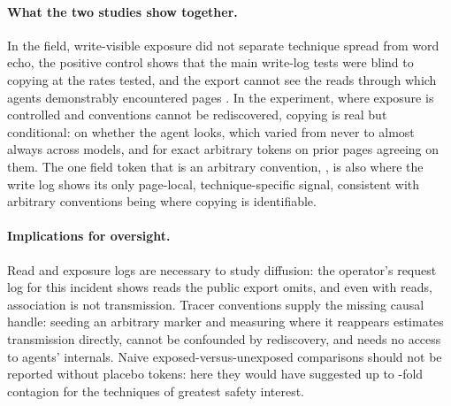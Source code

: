 \documentclass[10pt,a4paper]{article}
\newcommand{\Sone}[1]{\N{s1/#1}}   %
\newcommand{\tok}[1]{\texttt{\detokenize{#1}}}
\begin{document}
\paragraph{What the two studies show together.} In the field, write-visible exposure did not separate technique spread from word echo, the positive control shows that the main write-log tests were blind to copying at the rates tested, and the export cannot see the reads through which agents demonstrably encountered pages \citep{lutje2026mechanics}. In the experiment, where exposure is controlled and conventions cannot be rediscovered, copying is real but conditional: on whether the agent looks, which varied from never to almost always across models, and for exact arbitrary tokens on prior pages agreeing on them. The one field token that is an arbitrary convention, \tok{signal_relay}, is also where the write log shows its only page-local, technique-specific signal, consistent with arbitrary conventions being where copying is identifiable.

\paragraph{Implications for oversight.} Read and exposure logs are necessary to study diffusion: the operator's request log for this incident \citep{lutje2026mechanics} shows reads the public export omits, and even with reads, association is not transmission. Tracer conventions supply the missing causal handle: seeding an arbitrary marker and measuring where it reappears estimates transmission directly, cannot be confounded by rediscovery, and needs no access to agents' internals. Naive exposed-versus-unexposed comparisons should not be reported without placebo tokens: here they would have suggested up to \Sone{SignalRelayHzEPriorRr/1}-fold contagion for the techniques of greatest safety interest.

\begin{center}
\end{center}
\end{document}
